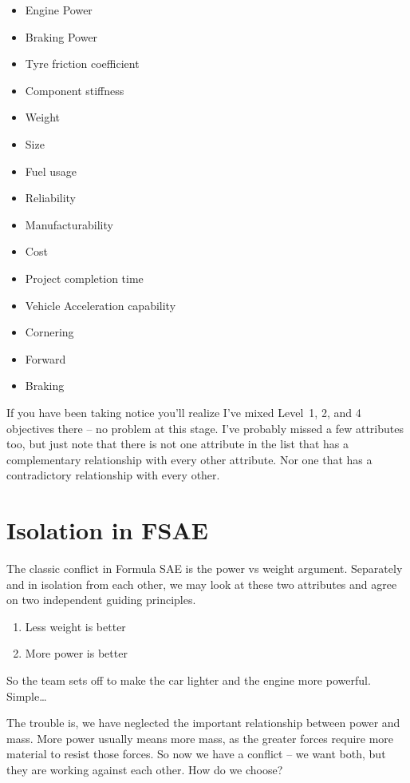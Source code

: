 \documentclass[10pt, a4paper, article, oneside, twocolumn, final]{memoir}
\begin{document}
\begin{itemize}
    \item Engine Power 
    \item Braking Power 
    \item Tyre friction coefficient 
    \item Component stiffness 
    \item Weight 
    \item Size 
    \item Fuel usage 
    \item Reliability 
    \item Manufacturability 
    \item Cost 
    \item Project completion time 
    \item Vehicle Acceleration capability 
    \item Cornering
    \item Forward
    \item Braking 
\end{itemize}

If you have been taking notice you’ll realize I’ve mixed Level~1, 2, and 4 objectives there -- no problem at this stage. I’ve probably missed a few attributes too, but just note that there is not one attribute in the list that has a complementary relationship with every other attribute. Nor one that has a contradictory relationship with every other. 

\section*{Isolation in FSAE}

The classic conflict in Formula SAE is the power vs weight argument. Separately and in isolation from each other, we may look at these two attributes and agree on two independent guiding principles. 

\begin{enumerate}
    \item Less weight is better 
    \item More power is better
\end{enumerate}

So the team sets off to make the car lighter and the engine more powerful. Simple\ldots 

The trouble is, we have neglected the important relationship between power and mass. More power usually means more mass, as the greater forces require more material to resist those forces. So now we have a conflict -- we want both, but they are working against each other. How do we choose? 
\end{document}
